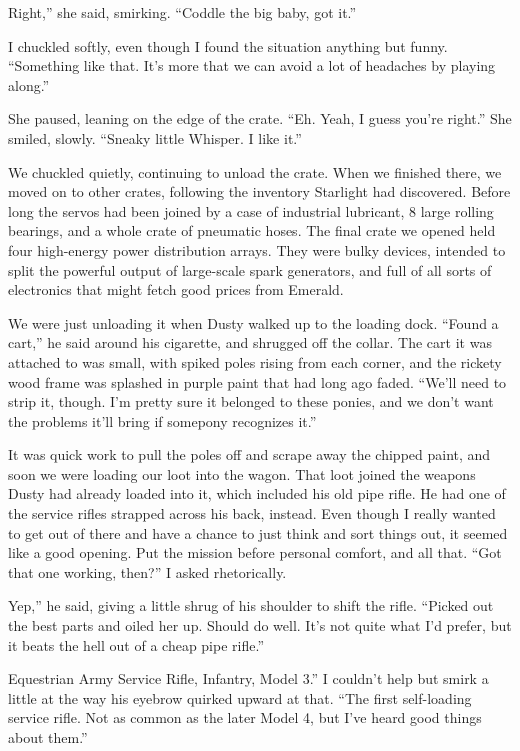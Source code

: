 \leavevmode{}Right,” she said, smirking. “Coddle the big baby, got it.”

I chuckled softly, even though I found the situation anything but funny. “Something like that. It’s more that we can avoid a lot of headaches by playing along.”

She paused, leaning on the edge of the crate. “Eh. Yeah, I guess you’re right.” She smiled, slowly. “Sneaky little Whisper. I like it.”

We chuckled quietly, continuing to unload the crate. When we finished there, we moved on to other crates, following the inventory Starlight had discovered. Before long the servos had been joined by a case of industrial lubricant, 8 large rolling bearings, and a whole crate of pneumatic hoses. The final crate we opened held four high-energy power distribution arrays. They were bulky devices, intended to split the powerful output of large-scale spark generators, and full of all sorts of electronics that might fetch good prices from Emerald.

We were just unloading it when Dusty walked up to the loading dock. “Found a cart,” he said around his cigarette, and shrugged off the collar. The cart it was attached to was small, with spiked poles rising from each corner, and the rickety wood frame was splashed in purple paint that had long ago faded. “We’ll need to strip it, though. I’m pretty sure it belonged to these ponies, and we don’t want the problems it’ll bring if somepony recognizes it.”

It was quick work to pull the poles off and scrape away the chipped paint, and soon we were loading our loot into the wagon. That loot joined the weapons Dusty had already loaded into it, which included his old pipe rifle. He had one of the service rifles strapped across his back, instead. Even though I really wanted to get out of there and have a chance to just think and sort things out, it seemed like a good opening. Put the mission before personal comfort, and all that. “Got that one working, then?” I asked rhetorically.

\leavevmode{}Yep,” he said, giving a little shrug of his shoulder to shift the rifle. “Picked out the best parts and oiled her up. Should do well. It’s not quite what I’d prefer, but it beats the hell out of a cheap pipe rifle.”

\leavevmode{}Equestrian Army Service Rifle, Infantry, Model 3.” I couldn’t help but smirk a little at the way his eyebrow quirked upward at that. “The first self-loading service rifle. Not as common as the later Model 4, but I’ve heard good things about them.”

